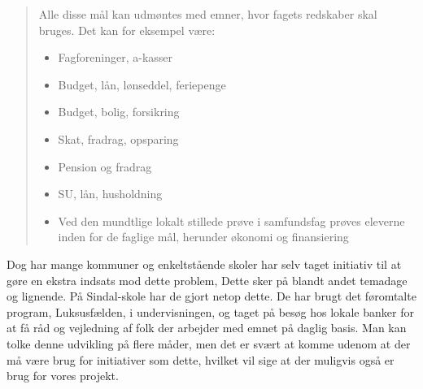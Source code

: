 \begin{quotation}
\begin{description}
\item{Alle disse mål kan udmøntes med emner, hvor fagets redskaber skal bruges. Det kan for eksempel være:}
\noindent \begin{itemize}
\item{Fagforeninger, a-kasser}
\item{Budget, lån, lønseddel, feriepenge}
\item{Budget, bolig, forsikring}
\item{Skat, fradrag, opsparing}
\item{Pension og fradrag}
\item{SU, lån, husholdning}
\item{Ved den mundtlige lokalt stillede prøve i samfundsfag prøves eleverne inden for de faglige mål, herunder økonomi og finansiering}
\end{itemize}
\end{description}
\end{quotation}

Dog har mange kommuner og enkeltstående skoler har selv taget initiativ til at gøre en ekstra indsats mod dette problem, Dette sker på blandt andet temadage og lignende. På Sindal-skole har de gjort netop dette. De har brugt det føromtalte program, Luksusfælden, i undervisningen, og taget på besøg hos lokale banker for at få råd og vejledning af folk der arbejder med emnet på daglig basis.
Man kan tolke denne udvikling på flere måder, men det er svært at komme udenom at der må være brug for initiativer som dette, hvilket vil sige at der muligvis også er brug for vores projekt.


 